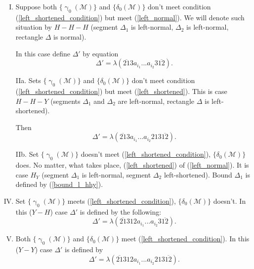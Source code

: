 \documentclass[a4paper, 12pt]{article}
\let\oldref\ref
\renewcommand{\ref}[1]{(\oldref{#1})}
\theoremstyle{definition}
\theoremstyle{definition}
\theoremstyle{proposition}
\theoremstyle{lemma}
\newcommand{\M}{\mathcal{M}}
\newcommand{\g}{\upgamma}
\renewcommand{\d}{\delta}
\newcommand{\D}{\Delta}
\begin{document}
\begin{enumerate}[I.]
	\item Suppose both $\{\g_0(\M)\}$ and $\{\d_0(\M)\}$
	don't meet condition \ref{left_shortened_condition} but meet \ref{left_normal}.
	We will denote such situation by $H-H-H$
	(segment $\D_1$ is left-normal, $\D_2$ is left-normal, rectangle $\D$ is normal).
	
	In this case define $\D'$ by equation
	\begin{equation}\tag{11.9}
		\D' = \lambda(\overline{21}3a_{i_1}... a_{i_2}3\overline{12}).
	\end{equation}
	
	\item[IIa.] Sets $\{\g_0(\M)\}$ and $\{\d_0(\M)\}$
	don't meet condition \ref{left_shortened_condition} but meet \ref{left_shortened}.
	This is case $H-H-Y$
	(segments $\D_1$ and $\D_2$ are left-normal, rectangle $\D$ is left-shortened).
	
	Then
	\begin{equation}\tag{11.10}\label{bound_l_hhy}
		\D' = \lambda(\overline{21}3a_{i_1}... a_{i_2}213\overline{12}).
	\end{equation}
	
	\item[IIb.] Set $\{\g_0(\M)\}$ doesn't meet \ref{left_shortened_condition},
	$\{\d_0(\M)\}$ does.
	No matter, what takes place, \ref{left_shortened} of \ref{left_normal}.
	It is case $H_Y$
	(segment $\D_1$ is left-normal, segment $\D_2$ left-shortened).
	Bound $\D_1$ is defined by \ref{bound_l_hhy}.
	
	\addtocounter{enumi}{1}
	\item Set $\{\g_0(\M)\}$ meets \ref{left_shortened_condition},
	$\{\d_0(\M)\}$ doesn't.
	In this ($Y-H$) case $\D'$ is defined by the following:
	\begin{equation}\tag{11.11}\label{bound_l_yh}
		\D' = \lambda(\overline{21}312a_{i_1}... a_{i_2}3\overline{12}).
	\end{equation}
	
	\item Both $\{\g_0(\M)\}$ and $\{\d_0(\M)\}$
	meet \ref{left_shortened_condition}.
	In this ($Y-Y$) case $\D'$ is defined by
	\begin{equation}\tag{11.12}
		\D' = \lambda(\overline{21}312a_{i_1}... a_{i_2}213\overline{12}).
	\end{equation}
\end{enumerate}
\end{document}

